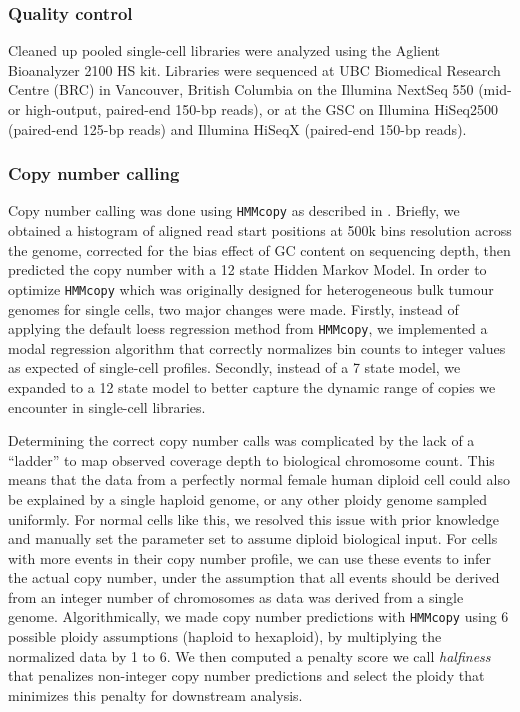 \documentclass{article}
\begin{document}
\subsubsection{Quality control}

Cleaned up pooled single-cell libraries were analyzed using the Aglient Bioanalyzer 2100 HS kit. Libraries were sequenced at UBC Biomedical Research Centre (BRC) in Vancouver, British Columbia on the Illumina NextSeq 550 (mid- or high-output, paired-end 150-bp reads), or at the GSC on Illumina HiSeq2500 (paired-end 125-bp reads) and Illumina HiSeqX (paired-end 150-bp reads).



\subsubsection{Copy number calling}
Copy number calling was done using \texttt{HMMcopy} as described in \citet{Ha2012}. 
Briefly, we obtained a histogram of aligned read start positions at 500k bins resolution across the genome, corrected for the bias effect of GC content on sequencing depth, then predicted the copy number with a 12 state Hidden Markov Model. In order to optimize \texttt{HMMcopy} which was originally designed for heterogeneous bulk tumour genomes for single cells, two major changes were made. Firstly, instead of applying the default loess regression method from \texttt{HMMcopy}, we implemented a modal regression algorithm that correctly normalizes bin counts to integer values as expected of single-cell profiles. Secondly, instead of a 7 state model, we expanded to a 12 state model to better capture the dynamic range of copies we encounter in single-cell libraries.

Determining the correct copy number calls was complicated by the lack of a ``ladder'' to map observed coverage depth to biological chromosome count. This means that the data from a perfectly normal female human diploid cell could also be explained by a single haploid genome, or any other ploidy genome sampled uniformly. For normal cells like this, we resolved this issue with prior knowledge and manually set the parameter set to assume diploid biological input. For cells with more events in their copy number profile, we can use these events to infer the actual copy number, under the assumption that all events should be derived from an integer number of chromosomes as data was derived from a single genome. Algorithmically, we made copy number predictions with \texttt{HMMcopy} using 6 possible ploidy assumptions (haploid to hexaploid), by multiplying the normalized data by 1 to 6. We then computed a penalty score we call \textit{halfiness} that penalizes non-integer copy number predictions and select the ploidy that minimizes this penalty for downstream analysis.
\end{document}
